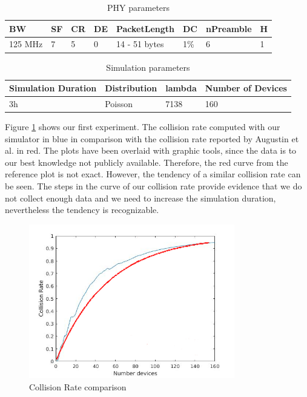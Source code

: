 \documentclass{article}
\begin{document}
\begin{table}
\begin{tabular}{ | l | l | l | l | l | l | l | l | }
\hline
        BW      & SF & CR & DE & PacketLength  & DC   & nPreamble & H \\ \hline
        125 MHz & 7  & 5  & 0  & 14 - 51 bytes & 1\% & 6         & 1 \\
\hline
\end{tabular}
\caption{PHY parameters}
\label{table:phy_params}
\end{table}

\begin{table}
\begin{tabular}{ | l | l | l | l | }
\hline
        Simulation Duration & Distribution & lambda & Number of Devices \\ \hline
        3h                  & Poisson      & 7138   & 160 \\
\hline
\end{tabular}
\caption{Simulation parameters}
\label{table:sim_params}
\end{table}

Figure \ref{fig:collissionratecomparison} shows our first experiment. The
collision rate computed with our simulator in blue in comparison with the
collision rate reported by Augustin et al. \cite{augustin2016study} in red. The
plots have been overlaid with graphic tools, since the data is to our best
knowledge not publicly available. Therefore, the red curve from the reference
plot is not exact. However, the tendency of a similar collision rate can be
seen. The steps in the curve of our collision rate provide evidence that we do
not collect enough data and we need to increase the simulation duration,
nevertheless the tendency is recognizable.\\

\begin{figure}[h]
    \centering
    \includegraphics[width=0.8\textwidth]{./figures/collision_rate_compare_lambda7138}
    \caption{Collision Rate comparison}
    \label{fig:collissionratecomparison}
\end{figure}
\end{document}
